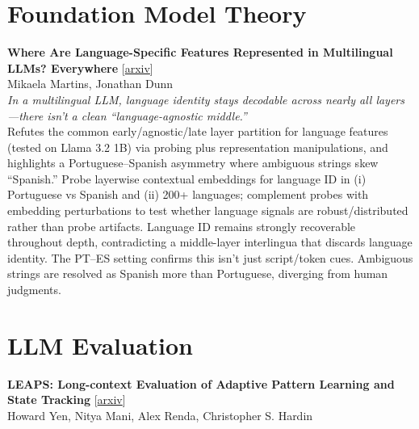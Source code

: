 \documentclass[12pt,letterpaper]{article}
\begin{document}
\medskip


\section*{Foundation Model Theory}

{\small\textbf{Where Are Language-Specific Features Represented in Multilingual LLMs? Everywhere}} {\scriptsize[\href{https://arxiv.org/abs/2610.25505}{arxiv}]}\\
{\scriptsize Mikaela Martins, Jonathan Dunn}\\

{\small\textit{In a multilingual LLM, language identity stays decodable across nearly all layers---there isn't a clean ``language-agnostic middle.''}}\\[1pt]
{\footnotesize Refutes the common early/agnostic/late layer partition for language features (tested on Llama 3.2 1B) via probing plus representation manipulations, and highlights a Portuguese--Spanish asymmetry where ambiguous strings skew ``Spanish.'' Probe layerwise contextual embeddings for language ID in (i) Portuguese vs Spanish and (ii) 200+ languages; complement probes with embedding perturbations to test whether language signals are robust/distributed rather than probe artifacts. Language ID remains strongly recoverable throughout depth, contradicting a middle-layer interlingua that discards language identity. The PT--ES setting confirms this isn't just script/token cues. Ambiguous strings are resolved as Spanish more than Portuguese, diverging from human judgments.}

\medskip


\section*{LLM Evaluation}

{\small\textbf{LEAPS: Long-context Evaluation of Adaptive Pattern Learning and State Tracking}} {\scriptsize[\href{https://arxiv.org/abs/2610.25919}{arxiv}]}\\
{\scriptsize Howard Yen, Nitya Mani, Alex Renda, Christopher S. Hardin}\\
\end{document}
